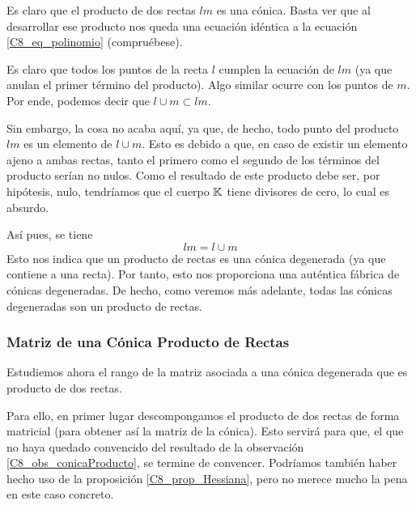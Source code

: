 \begin{obs}
	\label{C8_obs_conicaProducto}
	Es claro que el producto de dos rectas $lm$ es una cónica. Basta ver que al desarrollar ese producto nos queda una ecuación idéntica a la ecuación \eqref{C8_eq_polinomio} (compruébese).
\end{obs}
\begin{obs}
	\label{C8_obs_conicaProducto_union}
	Es claro que todos los puntos de la recta $l$ cumplen la ecuación de $lm$ (ya que anulan el primer término del producto). Algo similar ocurre con los puntos de $m$. Por ende, podemos decir que $l\cup m\subset lm$.
	
	Sin embargo, la cosa no acaba aquí, ya que, de hecho, todo punto del producto $lm$ es un elemento de $l\cup m$. Esto es debido a que, en caso de existir un elemento ajeno a ambas rectas, tanto el primero como el segundo de los términos del producto serían no nulos. Como el resultado de este producto debe ser, por hipótesis, nulo, tendríamos que el cuerpo $\mathbb{K}$ tiene divisores de cero, lo cual es absurdo.
	
	Así pues, se tiene
	\begin{equation}lm = l\cup m\end{equation}
	Esto nos indica que un producto de rectas es una cónica degenerada (ya que contiene a una recta). Por tanto, esto nos proporciona una auténtica fábrica de cónicas degeneradas. De hecho, como veremos más adelante, todas las cónicas degeneradas son un producto de rectas.
\end{obs}
\subsubsection{Matriz de una Cónica Producto de Rectas}
Estudiemos ahora el rango de la matriz asociada a una cónica degenerada que es producto de dos rectas.

Para ello, en primer lugar descompongamos el producto de dos rectas de forma matricial (para obtener así la matriz de la cónica). Esto servirá para que, el que no haya quedado convencido del resultado de la observación \ref{C8_obs_conicaProducto}, se termine de convencer. Podríamos también haber hecho uso de la proposición \ref{C8_prop_Hessiana}, pero no merece mucho la pena en este caso concreto.

